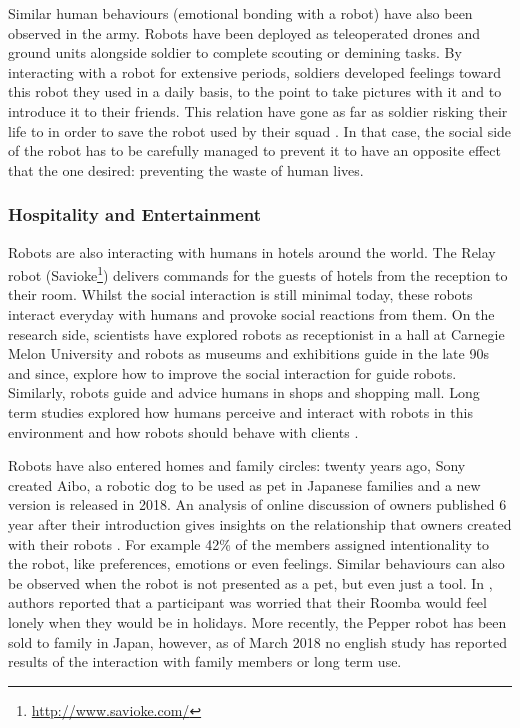     Similar human behaviours (emotional bonding with a robot) have also been observed in the army. Robots have been deployed as teleoperated drones and ground units alongside soldier to complete scouting or demining tasks. By interacting with a robot for extensive periods, soldiers developed feelings toward this robot they used in a daily basis, to the point to take pictures with it and to introduce it to their friends. This relation have gone as far as soldier risking their life to in order to save the robot used by their squad \citep{singer2009wired}. In that case, the social side of the robot has to be carefully managed to prevent it to have an opposite effect that the one desired: preventing the waste of human lives.
		
\subsubsection{Hospitality and Entertainment} 
	
	Robots are also interacting with humans in hotels around the world. The Relay robot (Savioke\footnote{\url{http://www.savioke.com/}}) delivers commands for the guests of hotels from the reception to their room. Whilst the social interaction is still minimal today, these robots interact everyday with humans and provoke social reactions from them. On the research side, scientists have explored robots as receptionist in a hall at Carnegie Melon University \citep{gockley2005designing} and robots as museums and exhibitions guide in the late 90s \citep{thrun1999minerva,burgard1999experiences} and since, explore how to improve the social interaction for guide robots. Similarly, robots guide and advice humans in shops and shopping mall. Long term studies explored how humans perceive and interact with robots in this environment \citep{kanda2009affective} and how robots should behave with clients \citep{kanda2008will}.

    Robots have also entered homes and family circles: twenty years ago, Sony created Aibo, a robotic dog to be used as pet in Japanese families and a new version is released in 2018. An analysis of online discussion of owners published 6 year after their introduction gives insights on the relationship that owners created with their robots \citep{friedman2003hardware}. For example 42\% of the members assigned intentionality to the robot, like preferences, emotions or even feelings. Similar behaviours can also be observed when the robot is not presented as a pet, but even just a tool. In \cite{fink2013living}, authors reported that a participant was worried that their Roomba would feel lonely when they would be in holidays. More recently, the Pepper robot has been sold to family in Japan, however, as of March 2018 no english study has reported results of the interaction with family members or long term use.

